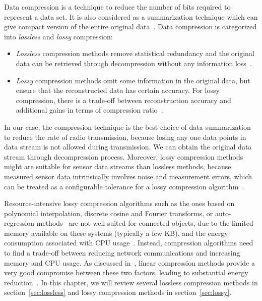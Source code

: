Data compression is a technique to reduce the number of bits required to
represent a data set. It is also considered as a summarization technique
which can give compact version of the entire original
data~\cite{hesabi2015data}. Data compression is categorized into
\emph{lossless} and \emph{lossy} compression:
\begin{itemize}
    \item \emph{Lossless} compression methods remove statistical redundancy and
    the original data can be retrieved through decompression without any
    information loss~\cite{hesabi2015data}.
    \item \emph{Lossy} compression methods omit some information in the original
    data, but ensure that the reconstructed data has certain accuracy. For lossy
    compression, there is a trade-off between reconstruction accuracy and
    additional gains in terms of compression ratio~\cite{zordan2014performance}.
\end{itemize}

In our case, the compression technique is the best choice of data summarization
to reduce the rate of radio transmission, because losing any one data points in
data stream is not allowed during transmission. We can obtain the original data
stream through decompression process. Moreover, lossy compression methods might
are suitable for sensor data streams than lossless methods, because measured
sensor data intrinsically involves noise and measurement errors, which can be
treated as a configurable tolerance for a lossy compression
algorithm~\cite{li2018multi}. 

Resource-intensive lossy compression algorithms such as the ones based on
polynomial interpolation, discrete cosine and Fourier transforms, or
auto-regression methods~\cite{lu2010optimized} are not well-suited for
connected objects, due to the limited memory available on these systems
(typically a few KB), and the energy consumption associated with CPU
usage~\cite{li2018multi}. Instead, compression algorithms need to find a
trade-off between reducing network communications and increasing memory and CPU
usage. As discussed in~\cite{zordan2014performance}, linear compression methods
provide a very good compromise between these two factors, leading to
substantial energy reduction~\cite{li2018multi}. In this chapter, we will
review several lossless compression methods in section~\ref{sec:lossless} and
lossy compression methods in section~\ref{sec:lossy}.
